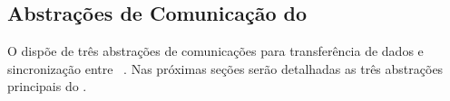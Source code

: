 \subsection{Abstrações de Comunicação do \nanvix}

O \nanvix dispõe de três abstrações de comunicações para transferência de dados e sincronização entre \clusters~\cite{penna:thesis}. Nas próximas seções serão detalhadas as três abstrações principais do \nanvix.


